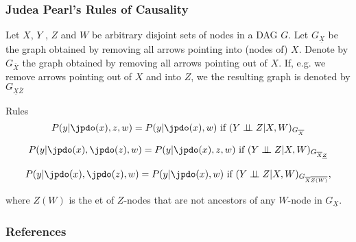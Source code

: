 \begin{frame}
\frametitle{Judea Pearl's Rules of Causality \cite{pearl2007mathematics}}

Let $X$, $Y$ , $Z$ and $W$ be arbitrary disjoint sets of nodes in a DAG $G$. Let $G_\underline{X}$ be the graph obtained by removing all arrows pointing into (nodes of) $X$. 
Denote by $G_{\overline{X}}$ the graph obtained by removing all arrows pointing out of $X$. If, e.g. we remove arrows pointing out of $X$ and into $Z$, we the resulting graph is denoted by $G_{\underline{X} \overline{Z}}$

Rules
\begin{equation}
P(y | \jpdo(x), z, w) = P(y | \jpdo(x), w) \textrm{ if } (Y \ci Z | X, W)_{G_{\overline{X}}}
\end{equation}

\begin{equation}
P(y | \jpdo(x), \jpdo(z), w) = P(y | \jpdo(x), z, w) \textrm{ if } (Y \ci Z | X, W)_{G_{\overline{X} \underline{Z}}}
\end{equation}

\begin{equation}
P(y | \jpdo(x), \jpdo(z), w) = P(y | \jpdo(x), w) \textrm{ if } (Y \ci Z | X, W)_{G_{\overline{X} \overline{Z(W)}}},
\end{equation}

where $Z(W)$ is the et of $Z$-nodes that are not ancestors of any $W$-node in $G_\underline{X}$.


\end{frame}

\begin{frame}[allowframebreaks]
    \frametitle{References}
    
    
\end{frame}

